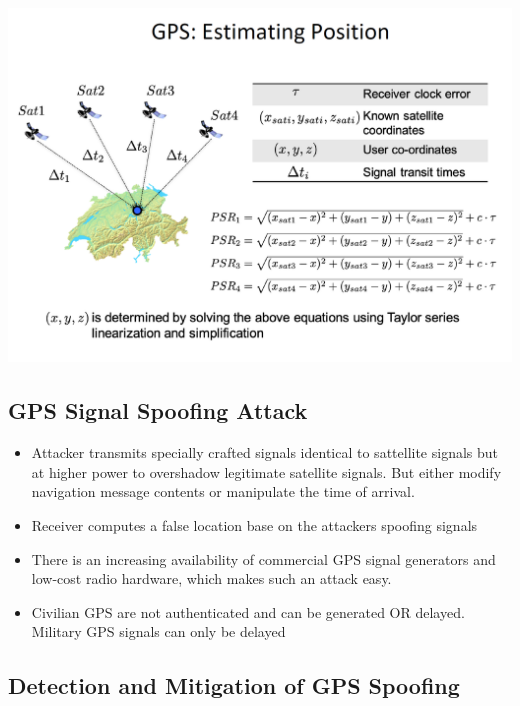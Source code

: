 \begin{minipage}{\linewidth}
    \centering      
    \includegraphics[width=\linewidth]{Figures/L4_positioning.PNG} 
\end{minipage}

\subsection{GPS Signal Spoofing Attack}
\begin{itemize}
    \item Attacker transmits specially crafted signals identical to sattellite signals but at higher power to overshadow legitimate satellite signals. But either modify navigation message contents or manipulate the time of arrival. 
    \item Receiver computes a false location base on the attackers spoofing signals
    \item There is an increasing availability of commercial GPS signal generators and low-cost radio hardware, which makes such an attack easy.
    \item Civilian GPS are not authenticated and can be generated OR delayed. Military GPS signals can only be delayed
\end{itemize}

\subsection{Detection and Mitigation of GPS Spoofing}
